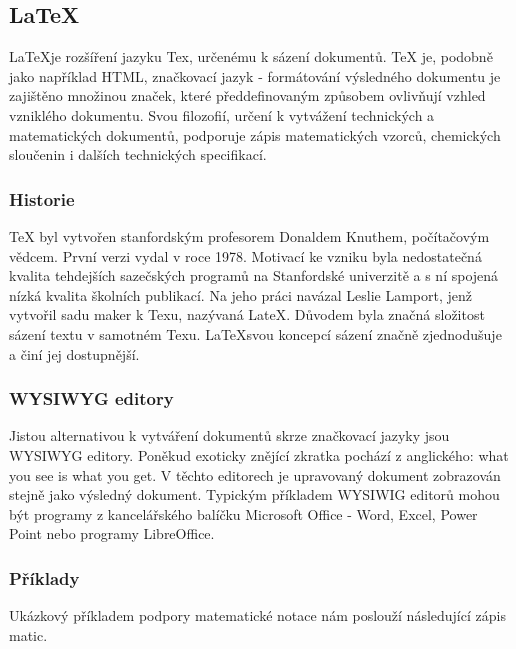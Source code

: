 \documentclass[main.tex]{subfiles}
\begin{document}
\subsection{\LaTeX}
\label{latex}
\LaTeX je rozšíření jazyku Tex, určenému k sázení dokumentů. TeX je, podobně jako například HTML, značkovací jazyk - formátování výsledného dokumentu je zajištěno množinou značek, které předdefinovaným způsobem ovlivňují vzhled vzniklého dokumentu. Svou filozofií, určení k vytvážení technických a matematických dokumentů, podporuje zápis matematických vzorců, chemických sloučenin i dalších technických specifikací. 

\subsubsection{Historie}
TeX byl vytvořen stanfordským profesorem Donaldem Knuthem, počítačovým vědcem. První verzi vydal v roce 1978. Motivací ke vzniku byla nedostatečná kvalita tehdejších sazečských programů na Stanfordské univerzitě a s ní spojená nízká kvalita školních publikací. Na jeho práci navázal Leslie Lamport, jenž vytvořil sadu maker k Texu, nazývaná LateX. Důvodem byla značná složitost sázení textu v samotném Texu. \LaTeX svou koncepcí sázení značně zjednodušuje a činí jej dostupnější. 


\subsubsection{WYSIWYG editory}
Jistou alternativou k vytváření dokumentů skrze značkovací jazyky jsou WYSIWYG editory. Poněkud exoticky znějící zkratka pochází z anglického: what you see is what you get. V těchto editorech je upravovaný dokument zobrazován stejně jako výsledný dokument. Typickým příkladem WYSIWIG editorů mohou být programy z kancelářského balíčku Microsoft Office - Word, Excel, Power Point nebo programy LibreOffice.



\subsubsection{Příklady}
Ukázkový příkladem podpory matematické notace nám poslouží následující zápis matic.
\end{document}
